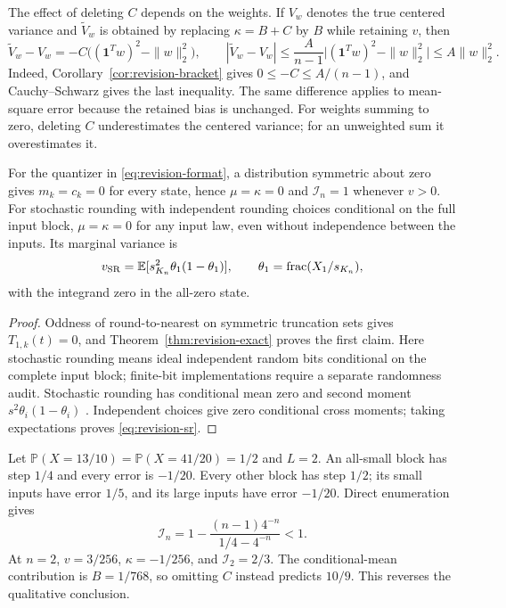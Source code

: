 The effect of deleting $C$ depends on the weights. If $V_w$ denotes the
true centered variance and $\widetilde V_w$ is obtained by replacing
$\kappa=B+C$ by $B$ while retaining $v$, then
\begin{equation}\label{eq:revision-weighted-approximation}
 \widetilde V_w-V_w
 =-C\bigl((\mathbf1^Tw)^2-\|w\|_2^2\bigr),\qquad
 |\widetilde V_w-V_w|
 \le\frac{A}{n-1}
       \bigl|(\mathbf1^Tw)^2-\|w\|_2^2\bigr|
 \le A\|w\|_2^2.
\end{equation}
Indeed, Corollary~\ref{cor:revision-bracket} gives
$0\le-C\le A/(n-1)$, and Cauchy--Schwarz gives the last inequality.
The same difference applies to mean-square error because the retained bias
is unchanged. For weights summing to zero, deleting $C$ underestimates the
centered variance; for an unweighted sum it overestimates it.

\begin{proposition}
\label{prop:revision-controls}
For the quantizer in \eqref{eq:revision-format}, a distribution symmetric
about zero gives $m_k=c_k=0$ for every state, hence $\mu=\kappa=0$ and
$\mathcal I_n=1$ whenever $v>0$. For stochastic rounding with independent
rounding choices conditional on the full input block, $\mu=\kappa=0$ for
any input law, even without independence between the inputs. Its marginal
variance is
\begin{equation}\label{eq:revision-sr}
 v_{\rm SR}=\mathbb E[s_{K_n}^2\theta_1(1-\theta_1)],\qquad
 \theta_1=\operatorname{frac}(X_1/s_{K_n}),
\end{equation}
with the integrand zero in the all-zero state.
\end{proposition}

\begin{proof}
Oddness of round-to-nearest on symmetric truncation sets gives
$T_{1,k}(t)=0$, and Theorem~\ref{thm:revision-exact} proves the first claim.
Here stochastic rounding means ideal independent random bits conditional on
the complete input block; finite-bit implementations require a separate
randomness audit. Stochastic rounding has conditional mean zero and second moment
$s^2\theta_i(1-\theta_i)$ \cite{connolly2021,croci2022}.
Independent choices give zero conditional cross moments; taking expectations
proves \eqref{eq:revision-sr}.
\end{proof}

\begin{example}
\label{ex:revision-deflation}
Let $\mathbb P(X=13/10)=\mathbb P(X=41/20)=1/2$ and $L=2$.
An all-small block has step $1/4$ and every error is $-1/20$. Every other
block has step $1/2$; its small inputs have error $1/5$, and its large
inputs have error $-1/20$. Direct enumeration gives
\begin{equation}\label{eq:revision-deflation}
 \mathcal I_n=1-\frac{(n-1)4^{-n}}{1/4-4^{-n}}<1.
\end{equation}
At $n=2$, $v=3/256$, $\kappa=-1/256$, and $\mathcal I_2=2/3$.
The conditional-mean contribution is $B=1/768$, so omitting $C$ instead
predicts $10/9$. This reverses the qualitative conclusion.
\end{example}

